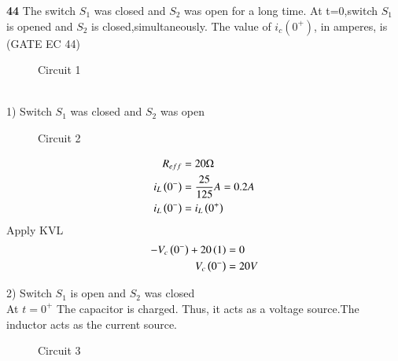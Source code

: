 \documentclass[journal,12pt,twocolumn]{IEEEtran}
\begin{document}


\vspace{3cm}

\title{}
\author{EE23BTECH11047 - Deepakreddy P
}
\maketitle
\newpage
\bigskip

\noindent \textbf{44} \quad The switch $S_1$ was closed and $S_2$ was open for a long time. At t=0,switch $S_1$ is opened and $S_2$ is closed,simultaneously. The value of $i_c(0^{+})$, in amperes, is  \hfill (GATE EC 44)

\begin{figure}[ht]
  \centering
  \begin{adjustbox}{width=\columnwidth}
      
  \end{adjustbox}
  \caption{Circuit 1}
\end{figure}

\solution
\\
1) Switch $S_1$ was closed and $S_2$ was open 
\begin{figure}[ht]
  \centering
  \begin{adjustbox}{width=\columnwidth}
      
  \end{adjustbox}
  \caption{Circuit 2}
\end{figure}

\begin{align}
    R_{eff} &= 20 \Omega \\
    i_{L} \left(0^-\right) &= \frac{25}{125} A = 0.2A\\
    i_{L} \left(0^-\right) &= i_{L} \left(0^+\right)\\
\end{align}
Apply KVL 
\begin{align}
    -V_c \left(0^-\right) + 20 \left(1\right) &= 0\\
    V_c \left(0^-\right) &= 20V
\end{align}

\bigskip

2) Switch $S_1$ is open and $S_2$ was closed\\

At $t=0^{+}$ The capacitor is charged. Thus, it acts as a voltage source.The inductor acts as the current source.

\bigskip

\begin{figure}[ht]
  \centering
  \begin{adjustbox}{width=\columnwidth}
      
  \end{adjustbox}
  \caption{Circuit 3}
\end{figure}
\end{document}
